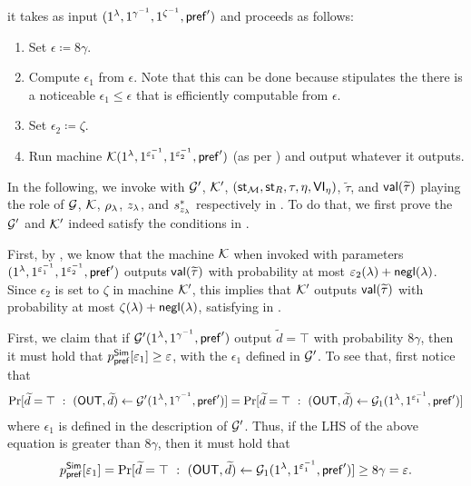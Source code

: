  it takes as input $(1^\lambda,1^{\gamma^{-1}}, 1^{\zeta^{-1}},\mathsf{pref}')$ and proceeds as follows:
\begin{enumerate}
\item
Set $\epsilon\coloneqq 8\gamma$.
\item
Compute $\epsilon_1$ from $\epsilon$. Note that this can be done because  stipulates the there is a noticeable $\epsilon_1 \le \epsilon$ that is efficiently computable from $\epsilon$.
\item
Set $\epsilon_2 \coloneqq \zeta$.
\item
Run machine $\mathcal{K}(1^\lambda, 1^{\varepsilon_1^{-1}}, 1^{\varepsilon_2^{-1}}, \mathsf{pref}')$ (as per ) and output whatever it outputs.
\end{enumerate}
In the following, we invoke  with $\mathcal{G}'$, $\mathcal{K}'$, $(\mathsf{st}_{\mathcal{M}}, \mathsf{st}_R, \tau,\eta,\mathsf{VI}_{\eta})$, $\tilde{\tau}$, and $\mathsf{val}(\widetilde{\tau})$  playing the role of $\mathcal{G}$,  $\mathcal{K}$, $\rho_\lambda$, $z_\lambda$, and $s^*_{z_\lambda}$ respectively in . To do that, we first prove the  $\mathcal{G}'$ and $\mathcal{K}'$ indeed satisfy the conditions  in . 

 First, by , we know that the machine $\mathcal{K}$ when invoked with parameters $(1^\lambda, 1^{\varepsilon_1^{-1}}, 1^{\varepsilon_2^{-1}}, \mathsf{pref}')$ outputs $\mathsf{val}(\widetilde{\tau})$ with probability at most $\varepsilon_2(\lambda) + \mathsf{negl}(\lambda)$. Since $\epsilon_2$ is set to $\zeta$ in machine $\mathcal{K}'$, this implies that $\mathcal{K}'$ outputs $\mathsf{val}(\widetilde{\tau})$ with probability at most $\zeta(\lambda) + \mathsf{negl}(\lambda)$, satisfying  in .

 First, we claim that if $\mathcal{G}'(1^\lambda, 1^{\gamma^{-1}}, \mathsf{pref}')$ output $\tilde{d}  = \top$ with probability $8\gamma$, then it must hold that $p_\mathsf{pref}^{\mathsf{Sim}}[\varepsilon_1] \ge \varepsilon$, with the $\epsilon_1$ defined in $\mathcal{G}'$. To see that, first notice that  
\begin{align*}
\Pr[\widetilde{d} = \top ~:~ (\mathsf{OUT}, \widetilde{d}) \leftarrow \mathcal{G}'(1^\lambda, 1^{\gamma^{-1}}, \mathsf{pref}')] =
\Pr[\widetilde{d} = \top ~:~ (\mathsf{OUT}, \widetilde{d}) \leftarrow \mathcal{G}_1(1^\lambda, 1^{\varepsilon_1^{-1}}, \mathsf{pref}')] 
\end{align*}
where $\epsilon_1$ is defined in the description of $\mathcal{G}'$. Thus, if the LHS of the above equation is greater than $8\gamma$, then it must hold that 
\begin{align*}
p_\mathsf{pref}^{\mathsf{Sim}}[\varepsilon_1] = \Pr[\widetilde{d} = \top ~:~ (\mathsf{OUT}, \widetilde{d}) \leftarrow \mathcal{G}_1(1^\lambda, 1^{\varepsilon_1^{-1}}, \mathsf{pref}')] \ge 8\gamma = \varepsilon. 
\end{align*}

